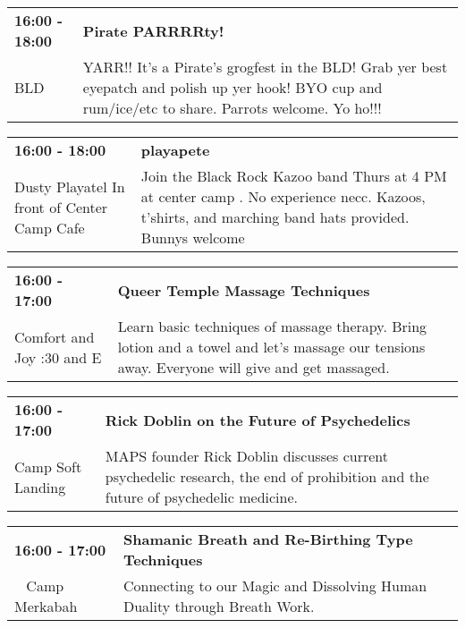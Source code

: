 \begin{tabular}{ p{1in} p{2.2in} }
    \textbf{16:00 - 18:00} & \textbf{Pirate PARRRRty!} \\
    BLD \newline  & YARR!! It's a Pirate's grogfest in the BLD! Grab yer best eyepatch and polish up yer hook! BYO cup and rum/ice/etc to share. Parrots welcome. Yo ho!!! \\
    \hline 
\end{tabular}
    
\begin{tabular}{ p{1in} p{2.2in} }
    \textbf{16:00 - 18:00} & \textbf{playapete} \\
    Dusty Playatel \newline In front of Center Camp Cafe & Join the Black Rock Kazoo band Thurs at 4 PM at center camp . No experience necc. Kazoos, t'shirts, and marching band hats provided. Bunnys welcome \\
    \hline 
\end{tabular}
    
\begin{tabular}{ p{1in} p{2.2in} }
    \textbf{16:00 - 17:00} & \textbf{Queer Temple Massage Techniques} \\
    Comfort and Joy \newline 7:30 and E & Learn basic techniques of massage therapy.  Bring lotion and a towel and let's massage our tensions away. Everyone will give and get massaged. \\
    \hline 
\end{tabular}
    
\begin{tabular}{ p{1in} p{2.2in} }
    \textbf{16:00 - 17:00} & \textbf{Rick Doblin on the Future of Psychedelics} \\
    Camp Soft Landing \newline  & MAPS founder Rick Doblin discusses current psychedelic research, the end of prohibition and the future of psychedelic medicine. \\
    \hline 
\end{tabular}
    
\begin{tabular}{ p{1in} p{2.2in} }
    \textbf{16:00 - 17:00} & \textbf{Shamanic Breath and Re-Birthing Type Techniques} \\
    ~ \newline Camp Merkabah & Connecting to our Magic and Dissolving Human Duality through Breath Work. \\
    \hline 
\end{tabular}
    
